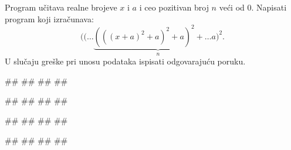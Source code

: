 \begin{Exercise}[label=1.3_49] 
Program učitava realne brojeve $x$ i $a$ i ceo pozitivan broj $n$ veći
od $0$.  Napisati program koji izračunava:
 $$((\ldots \underbrace{(((x+a)^2 + a)^2 + a)^2 + \ldots a)^2}_n.$$ U
slučaju greške pri unosu podataka ispisati odgovarajuću poruku. 

\begin{miditest}
\begin{upotreba}{1}
#\naslovInt#
##
##
##
\end{upotreba}
\end{miditest}
\begin{miditest}
\begin{upotreba}{2}
#\naslovInt#
##
##
##
\end{upotreba}
\end{miditest}

\begin{miditest}
\begin{upotreba}{3}
#\naslovInt#
##
##
##
\end{upotreba}
\end{miditest}
\begin{miditest}
\begin{upotreba}{4}
#\naslovInt#
##
##
##
\end{upotreba}
\end{miditest}
\end{Exercise}
\begin{Answer}[ref=1.3_49]
\end{Answer}


